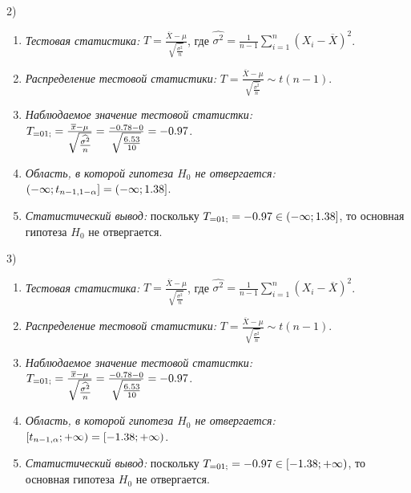 2) 

\begin{enumerate}
\item  \textit{Тестовая статистика:} $T=\frac{\overline{X}-\mu }{\sqrt{{\tfrac{\widehat{\sigma ^{2} }}{n}} } } $, где $\widehat{\sigma ^{2} }=\frac{1}{n-1} \sum _{i=1}^{n}\left(X_{i} -\overline{X}\right)^{2}  $.

\item  \textit{Распределение тестовой статистики:} $T=\frac{\overline{X}-\mu }{\sqrt{{\tfrac{\widehat{\sigma ^{2} }}{n}} } } \sim t\left(n-1\right)$.

\item  \textit{Наблюдаемое значение тестовой статистки:} $T_{=01;} =\frac{\overline{x}-\mu }{\sqrt{{\tfrac{\widehat{\sigma ^{2} }}{n}} } } =\frac{-0.78-0}{\sqrt{{\tfrac{{\rm 6.53}}{10}} } } =-{\rm 0.97}$.

\item  \textit{Область, в которой гипотеза $H_{0} $ не отвергается:} $\left(-\infty ;t_{n-1,1-\alpha } \right]=\left(-\infty ;{\rm 1.38}\right]$.

\item  \textit{Статистический вывод:} поскольку $T_{=01;} =-{\rm 0.97}\in \left(-\infty ;{\rm 1.38}\right]$, то основная гипотеза $H_{0} $ не отвергается.
\end{enumerate}



3) 

\begin{enumerate}
\item  \textit{Тестовая статистика:} $T=\frac{\overline{X}-\mu }{\sqrt{{\tfrac{\widehat{\sigma ^{2} }}{n}} } } $, где $\widehat{\sigma ^{2} }=\frac{1}{n-1} \sum _{i=1}^{n}\left(X_{i} -\overline{X}\right)^{2}  $.

\item  \textit{Распределение тестовой статистики:} $T=\frac{\overline{X}-\mu }{\sqrt{{\tfrac{\widehat{\sigma ^{2} }}{n}} } } \sim t\left(n-1\right)$.

\item  \textit{Наблюдаемое значение тестовой статистки:} $T_{=01;} =\frac{\overline{x}-\mu }{\sqrt{{\tfrac{\widehat{\sigma ^{2} }}{n}} } } =\frac{-0.78-0}{\sqrt{{\tfrac{{\rm 6.53}}{10}} } } =-{\rm 0.97}$.

\item  \textit{Область, в которой гипотеза $H_{0} $ не отвергается:} $\left[t_{n-1,\alpha } ;+\infty \right)=\left[-{\rm 1.38};+\infty \right)$.

\item  \textit{Статистический вывод:} поскольку $T_{=01;} =-{\rm 0.97}\in \left[-{\rm 1.38};+\infty \right)$, то основная гипотеза $H_{0} $ не отвергается.
\end{enumerate}



